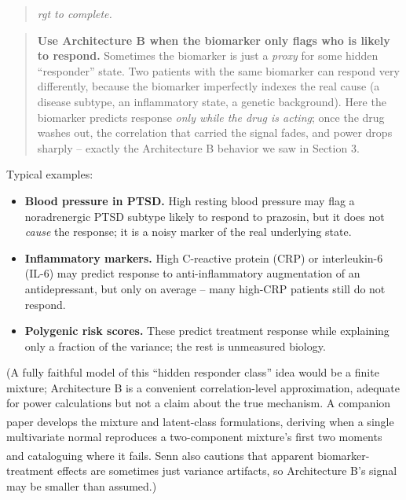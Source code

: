 \documentclass[
  11pt,
]{article}
\newenvironment{rgt}{%
  \begin{quote}\small\itshape\color[RGB]{20,60,160}}{%
  \end{quote}}
\newenvironment{orig}{%
  \begin{quote}\normalsize\color[gray]{0.55}}{%
  \end{quote}}
\begin{document}
\begin{rgt}
rgt to complete.

\end{rgt}

\begin{orig}
\textbf{Use Architecture B when the biomarker only flags who is
likely to respond.} Sometimes the biomarker is just a \emph{proxy} for
some hidden ``responder'' state. Two patients with the same biomarker
can respond very differently, because the biomarker imperfectly indexes
the real cause (a disease subtype, an inflammatory state, a genetic
background). Here the biomarker predicts response \emph{only while the
drug is acting}; once the drug washes out, the correlation that carried
the signal fades, and power drops sharply -- exactly the Architecture B
behavior we saw in Section 3.

\end{orig}

Typical examples:

\begin{itemize}
\item \textbf{Blood pressure in PTSD.} High resting blood pressure may
  flag a noradrenergic PTSD subtype likely to respond to prazosin,
  but it does not \emph{cause} the response; it is a noisy marker of
  the real underlying state.
\item \textbf{Inflammatory markers.} High C-reactive protein (CRP)
  or interleukin-6 (IL-6) may predict
  response to anti-inflammatory augmentation of an antidepressant,
  but only on average -- many high-CRP patients still do not respond.
\item \textbf{Polygenic risk scores.} These predict treatment
  response while explaining only a fraction of the variance; the
  rest is unmeasured biology.
\end{itemize}

(A fully faithful model of this ``hidden responder class'' idea would be
a finite mixture; Architecture B is a convenient correlation-level
approximation, adequate for power calculations but not a claim about the
true mechanism. A companion
paper\textsuperscript{} develops the
mixture and latent-class formulations, deriving when a single
multivariate normal reproduces a two-component mixture's first two
moments and cataloguing where it fails.
Senn\textsuperscript{} also cautions
that apparent biomarker-treatment effects are sometimes just variance
artifacts, so Architecture B's signal may be smaller than assumed.)
\end{document}
